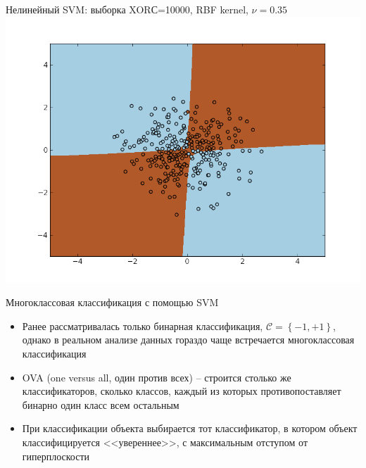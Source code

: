 \documentclass[red,unicode]{beamer}
\begin{document}
\begin{frame}{Нелинейный SVM: выборка XOR}{С=10000, RBF kernel, $\nu=0.35$}
~\\[-1cm]
\includegraphics[width=\textwidth]{SVM-nonlinear.png}
\end{frame}

\begin{frame}{Многоклассовая классификация с помощью SVM}{}
\begin{itemize}
	\item Ранее рассматривалась только бинарная классификация, $\mathcal{C} = \left\{ -1 , +1 \right\}$, однако в реальном анализе данных гораздо чаще встречается многоклассовая классификация
	\item OVA (one versus all, один против всех) -- строится столько же классификаторов, сколько классов, каждый из которых противопоставляет бинарно один класс всем остальным
	\item При классификации объекта выбирается тот классификатор, в котором объект классифицируется <<увереннее>>, с максимальным отступом от гиперплоскости
\end{itemize}
\end{frame}




\end{document}
